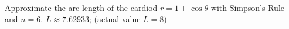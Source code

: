 {Approximate the arc length of the cardiod $r=1+\cos\theta$ with Simpson's Rule and $n=6.$
}
{$L\approx 7.62933$; (actual value $L=8$)
}
